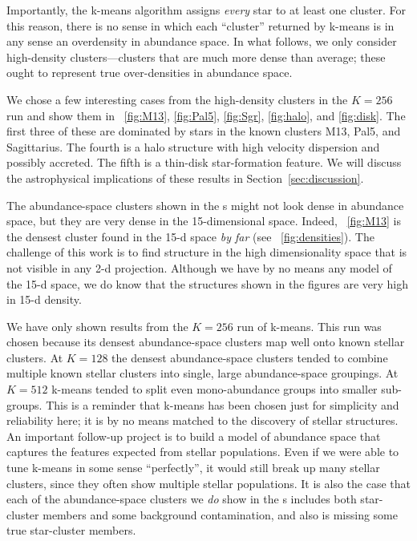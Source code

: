 \documentclass[12pt, letterpaper, preprint]{aastex}
\newcommand{\sectionname}{Section}
\begin{document}
Importantly, the k-means algorithm assigns \emph{every} star to at
least one cluster.
For this reason, there is no sense in which each ``cluster'' returned
by k-means is in any sense an overdensity in abundance space.
In what follows, we only consider high-density clusters---clusters
that are much more dense than average; these ought to represent true
over-densities in abundance space.

We chose a few interesting cases from the high-density clusters
in the $K=256$ run and show them in
\figurename~\ref{fig:M13}, \ref{fig:Pal5}, \ref{fig:Sgr},
\ref{fig:halo}, and \ref{fig:disk}.
The first three of these are dominated by stars in the known clusters
M13, Pal5, and Sagittarius.
The fourth is a halo structure with high velocity dispersion and
possibly accreted.
The fifth is a thin-disk star-formation feature.
We will discuss the astrophysical implications of these results in
\sectionname~\ref{sec:discussion}.

The abundance-space clusters shown in the \figurename s
might not look dense in abundance space, but they
are very dense in the 15-dimensional space.  Indeed,
\figurename~\ref{fig:M13} is the densest cluster found in the 15-d
space \emph{by far} (see \figurename~\ref{fig:densities}).
The challenge of this work is to find structure in the high
dimensionality space that is not visible in any 2-d projection.
Although we have by no means any model of the 15-d space, we do know
that the structures shown in the figures are very high in 15-d
density.

We have only shown results from the $K=256$ run of k-means.
This run was chosen because its densest abundance-space clusters map
well onto known stellar clusters.
At $K=128$ the densest abundance-space clusters tended to combine
multiple known stellar clusters into single, large abundance-space
groupings.
At $K=512$ k-means tended to split even mono-abundance groups into
smaller sub-groups.
This is a reminder that k-means has been chosen just for simplicity
and reliability here; it is by no means matched to the discovery of
stellar structures.
An important follow-up project is to build a model of abundance space
that captures the features expected from stellar populations.
Even if we were able to tune k-means in some sense ``perfectly'', it
would still break up many stellar clusters, since they often show
multiple stellar populations.
It is also the case that each of the abundance-space clusters we
\emph{do} show in the \figurename s includes both star-cluster members
and some background contamination, and also is missing some true
star-cluster members.
\end{document}
